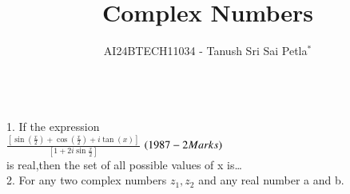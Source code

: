 \documentclass[journal,12pt,twocolumn]{IEEEtran}
\theoremstyle{remark}
\begin{document}

\vspace{3cm}

\title{Complex Numbers}
\author{AI24BTECH11034 - Tanush Sri Sai Petla$^{*}$%
}

\\
1. If the expression    \\        

$\frac{[\sin(\frac{x}{2}) + \cos(\frac{x}{2}) + i\tan(x)]}{[1+2i\sin\frac{x}{2}]}   $  $\hfill(1987 - 2 Marks)$\\
is real,then the set of all possible values of x is\ldots\\
2.  For any two complex numbers $z_1,z_2$ and any real number a and b.
\end{document}
